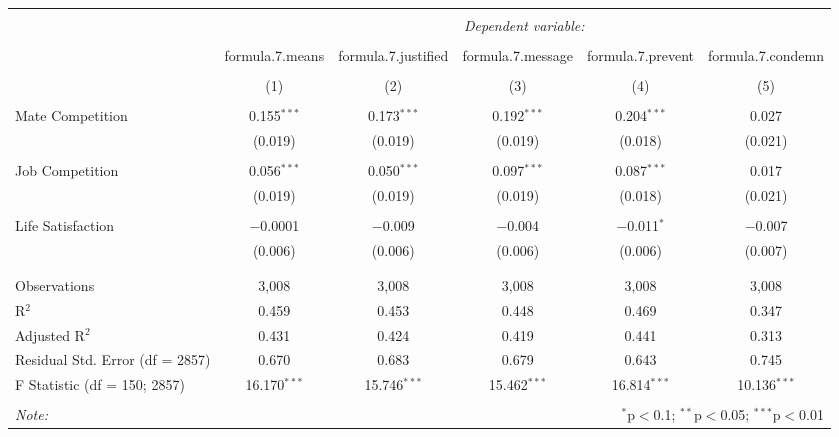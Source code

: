 
\begin{table}[!htbp] \centering 
  \caption{} 
  \label{} 
\begin{tabular}{@{\extracolsep{5pt}}lccccc} 
\\[-1.8ex]\hline 
\hline \\[-1.8ex]
 & \multicolumn{5}{c}{\textit{Dependent variable:}} \\
\cline{2-6} 
\\[-1.8ex] & formula.7.means & formula.7.justified & formula.7.message & formula.7.prevent & formula.7.condemn \\ 
\\[-1.8ex] & (1) & (2) & (3) & (4) & (5)\\ 
\hline \\[-1.8ex] 
 Mate Competition & 0.155$^{***}$ & 0.173$^{***}$ & 0.192$^{***}$ & 0.204$^{***}$ & 0.027 \\ 
  & (0.019) & (0.019) & (0.019) & (0.018) & (0.021) \\ 
  & & & & & \\ 
 Job Competition & 0.056$^{***}$ & 0.050$^{***}$ & 0.097$^{***}$ & 0.087$^{***}$ & 0.017 \\ 
  & (0.019) & (0.019) & (0.019) & (0.018) & (0.021) \\ 
  & & & & & \\ 
 Life Satisfaction & $-$0.0001 & $-$0.009 & $-$0.004 & $-$0.011$^{*}$ & $-$0.007 \\ 
  & (0.006) & (0.006) & (0.006) & (0.006) & (0.007) \\ 
  & & & & & \\ 
\hline \\[-1.8ex] 
Observations & 3,008 & 3,008 & 3,008 & 3,008 & 3,008 \\ 
R$^{2}$ & 0.459 & 0.453 & 0.448 & 0.469 & 0.347 \\ 
Adjusted R$^{2}$ & 0.431 & 0.424 & 0.419 & 0.441 & 0.313 \\ 
Residual Std. Error (df = 2857) & 0.670 & 0.683 & 0.679 & 0.643 & 0.745 \\ 
F Statistic (df = 150; 2857) & 16.170$^{***}$ & 15.746$^{***}$ & 15.462$^{***}$ & 16.814$^{***}$ & 10.136$^{***}$ \\ 
\hline 
\hline \\[-1.8ex] 
\textit{Note:}  & \multicolumn{5}{r}{$^{*}$p$<$0.1; $^{**}$p$<$0.05; $^{***}$p$<$0.01} \\ 
\end{tabular} 
\end{table} 
